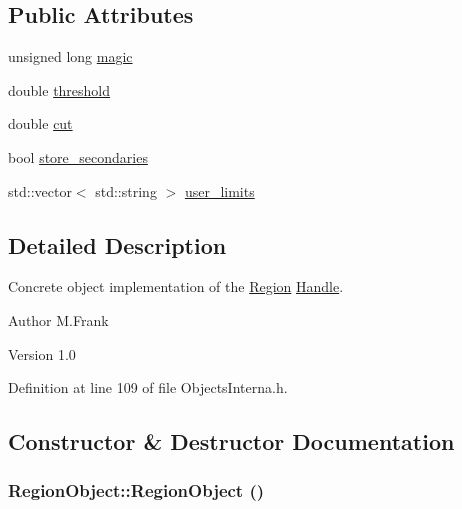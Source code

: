 \subsection*{Public Attributes}
\begin{DoxyCompactItemize}
\item 
unsigned long \hyperlink{class_d_d4hep_1_1_geometry_1_1_region_object_aff7bdedd83403e65c3b749c759e30316}{magic}
\item 
double \hyperlink{class_d_d4hep_1_1_geometry_1_1_region_object_a62b96102392556bd53f18a440dff1483}{threshold}
\item 
double \hyperlink{class_d_d4hep_1_1_geometry_1_1_region_object_a6f1d69c54ce278aea8af3fbad679b0d3}{cut}
\item 
bool \hyperlink{class_d_d4hep_1_1_geometry_1_1_region_object_a531d5176989429dfcb6c6cce094ee209}{store\_\-secondaries}
\item 
std::vector$<$ std::string $>$ \hyperlink{class_d_d4hep_1_1_geometry_1_1_region_object_a6d6a6cffbfc5b1937b3b1c46e2580430}{user\_\-limits}
\end{DoxyCompactItemize}


\subsection{Detailed Description}
Concrete object implementation of the \hyperlink{class_d_d4hep_1_1_geometry_1_1_region}{Region} \hyperlink{class_d_d4hep_1_1_handle}{Handle}. \begin{DoxyAuthor}{Author}
M.Frank 
\end{DoxyAuthor}
\begin{DoxyVersion}{Version}
1.0 
\end{DoxyVersion}


Definition at line 109 of file ObjectsInterna.h.

\subsection{Constructor \& Destructor Documentation}
\hypertarget{class_d_d4hep_1_1_geometry_1_1_region_object_a2ef1c820eaadf3add13852335e791a62}{
\subsubsection[{RegionObject}]{\setlength{\rightskip}{0pt plus 5cm}RegionObject::RegionObject ()}}
\label{class_d_d4hep_1_1_geometry_1_1_region_object_a2ef1c820eaadf3add13852335e791a62}


